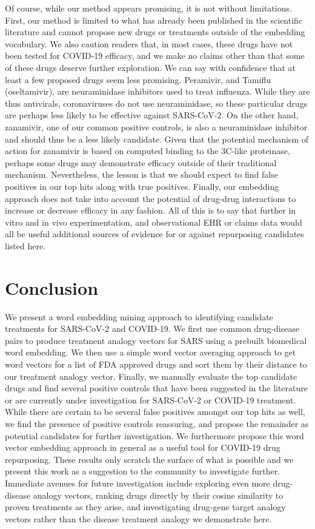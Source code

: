 \documentclass{article}
\begin{document}
Of course, while our method appears promising, it is not without limitations.
First, our method is limited to what has already been published in the scientific literature and cannot propose new drugs or treatments outside of the embedding vocabulary.
We also caution readers that, in most cases, these drugs have not been tested for COVID-19 efficacy, and we make no claims other than that some of these drugs deserve further exploration.
We can say with confidence that at least a few proposed drugs seem less promising.
Peramivir, and Tamiflu (oseltamivir), are neuraminidase inhibitors used to treat influenza.
While they are thus antivirals, coronaviruses do not use neuraminidase, so these particular drugs are perhaps less likely to be effective against SARS-CoV-2\cite{mccreary2020coronavirus}.
On the other hand, zanamivir, one of our common positive controls\cite{hall2020search}, is also a neuraminidase inhibitor and should thus be a less likely candidate.
Given that the potential mechanism of action for zanamivir is based on computed binding to the 3C-like proteinase, perhaps some drugs may demonstrate efficacy outside of their traditional mechanism.
Nevertheless, the lesson is that we should expect to find false positives in our top hits along with true positives.
Finally, our embedding approach does not take into account the potential of drug-drug interactions to increase or decrease efficacy in any fashion.
All of this is to say that further in vitro and in vivo experimentation, and observational EHR or claims data would all be useful additional sources of evidence for or against repurposing candidates listed here.


\section{Conclusion}

We present a word embedding mining approach to identifying candidate treatments for SARS-CoV-2 and COVID-19.
We first use common drug-disease pairs to produce treatment analogy vectors for SARS using a prebuilt biomedical word embedding.
We then use a simple word vector averaging approach to get word vectors for a list of FDA approved drugs and sort them by their distance to our treatment analogy vector.
Finally, we manually evaluate the top candidate drugs and find several positive controls that have been suggested in the literature or are currently under investigation for SARS-CoV-2 or COVID-19 treatment.
While there are certain to be several false positives amongst our top hits as well, we find the presence of positive controls reassuring, and propose the remainder as potential candidates for further investigation.
We furthermore propose this word vector embedding approach in general as a useful tool for COVID-19 drug repurposing.
These results only scratch the surface of what is possible and we present this work as a suggestion to the community to investigate further.
Immediate avenues for future investigation include exploring even more drug-disease analogy vectors, ranking drugs directly by their cosine similarity to proven treatments as they arise, and investigating drug-gene target analogy vectors rather than the disease treatment analogy we demonstrate here.



\end{document}
